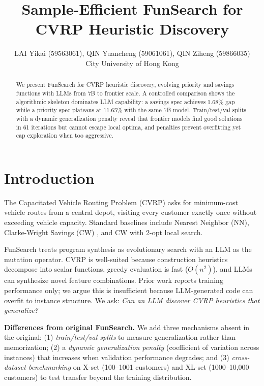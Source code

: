 \documentclass{article}
\title{Sample-Efficient FunSearch for CVRP Heuristic Discovery}
\author{LAI Yikai (59563061), QIN Yuancheng (59061061), QIN Ziheng (59866035) \\
City University of Hong Kong}
\begin{document}
\maketitle
\vspace{-10pt}

\begin{abstract}
We present FunSearch for CVRP heuristic discovery, evolving priority and savings functions with LLMs from 7B to frontier scale. A controlled comparison shows the algorithmic skeleton dominates LLM capability: a savings spec achieves 1.68\% gap while a priority spec plateaus at 11.65\% with the same 7B model. Train/test/val splits with a dynamic generalization penalty reveal that frontier models find good solutions in 61 iterations but cannot escape local optima, and penalties prevent overfitting yet cap exploration when too aggressive.
\end{abstract}

\vspace{-6pt}
\section{Introduction}
\vspace{-4pt}

The Capacitated Vehicle Routing Problem (CVRP) asks for minimum-cost vehicle routes from a central depot, visiting every customer exactly once without exceeding vehicle capacity. Standard baselines include Nearest Neighbor (NN), Clarke-Wright Savings (CW) \citep{clarke1964}, and CW with 2-opt local search.

FunSearch \citep{romero2023funsearch} treats program synthesis as evolutionary search with an LLM as the mutation operator. CVRP is well-suited because construction heuristics decompose into scalar functions, greedy evaluation is fast ($O(n^2)$), and LLMs can synthesize novel feature combinations. Prior work reports training performance only; we argue this is insufficient because LLM-generated code can overfit to instance structure. We ask: \emph{Can an LLM discover CVRP heuristics that generalize?}

\textbf{Differences from original FunSearch.} We add three mechanisms absent in the original: (1) \emph{train/test/val splits} to measure generalization rather than memorization; (2) a \emph{dynamic generalization penalty} (coefficient of variation across instances) that increases when validation performance degrades; and (3) \emph{cross-dataset benchmarking} on X-set (100--1001 customers) and XL-set (1000--10,000 customers) to test transfer beyond the training distribution.
\end{document}
